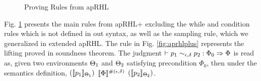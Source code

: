\documentclass[a4paper,11pt]{article}
\begin{document}
\begin{figure}[ht]
\caption{Proving Rules from apRHL}
\label{fig:aprhl}
\end{figure}
%
Fig. \ref{fig:aprhl} presents the main rules from apRHL+ \cite{barthe2016proving} excluding the while and condition rules which is not defined in out syntax, as well as the sampling rule, which we generalized in extended apRHL.
The rule in Fig. \ref{fig:aprhlplus} represents the lifting proved in soundness theorem.
%
The judgment $\vdash p_1 \sim_{\epsilon, \delta} p_2: \Phi_0 \Rightarrow \Phi$ is read as, given two environments $\Theta_1$ and $\Theta_2$ satisfying precondition $\Phi_0$, 
%
then under the semantics definition, 
$(\llbracket p_1 \rrbracket_{\Theta_1})$ 
$\llbracket \Phi \rrbracket^{\#(\epsilon, \delta)}$ 
$(\llbracket p_2 \rrbracket_{\Theta_2})$.
\end{document}

